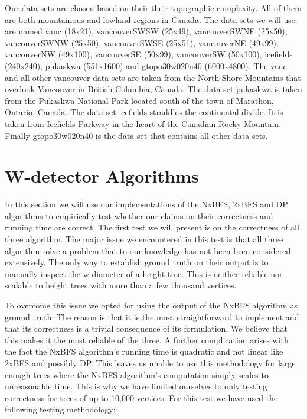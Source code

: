 Our data sets are chosen based on their their topographic complexity. All of them are both mountainous and lowland regions in Canada. The data sets we will use are named vanc (18x21), vancouverSWSW (25x49), vancouverSWNE (25x50), vancouverSWNW (25x50), vancouverSWSE (25x51), vancouverNE (49x99), vancouverNW (49x100), vancouverSE (50x99), vancouverSW (50x100), icefields (240x240), pukaskwa (551x1600) and gtopo30w020n40 (6000x4800). The vanc and all other vancouver data sets are taken from the North Shore Mountains that overlook Vancouver in British Columbia, Canada. The data set pukaskwa is taken from the Pukaskwa National Park located south of the town of Marathon, Ontario, Canada. The data set icefields straddles the continental divide. It is taken from Icefields Parkway in the heart of the Canadian Rocky Mountain. Finally gtopo30w020n40 is the data set that contains all other data sets.

\section{W-detector Algorithms}

In this section we will use our implementations of the NxBFS, 2xBFS and DP algorithms to empirically test whether our claims on their correctness and running time are correct. The first test we will present is on the correctness of all three algorithm. The major issue we encountered in this test is that all three algorithm solve a problem that to our knowledge has not been been considered extensively. The only way to establish ground truth on their output is to manually inspect the w-diameter of a height tree. This is neither reliable nor scalable to height trees with more than a few thousand vertices.

To overcome this issue we opted for using the output of the NxBFS algorithm as ground truth. The reason is that it is the most straightforward to implement and that its correctness is a trivial consequence of its formulation. We believe that this makes it the most reliable of the three. A further complication arises with the fact the NxBFS algorithm's running time is quadratic and not linear like 2xBFS and possibly DP. This leaves us unable to use this methodology for large enough trees where the NxBFS algorithm's computation simply scales to unreasonable time. This is why we have limited ourselves to only testing correctness for trees of up to 10,000 vertices. For this test we have used the following testing methodology:

